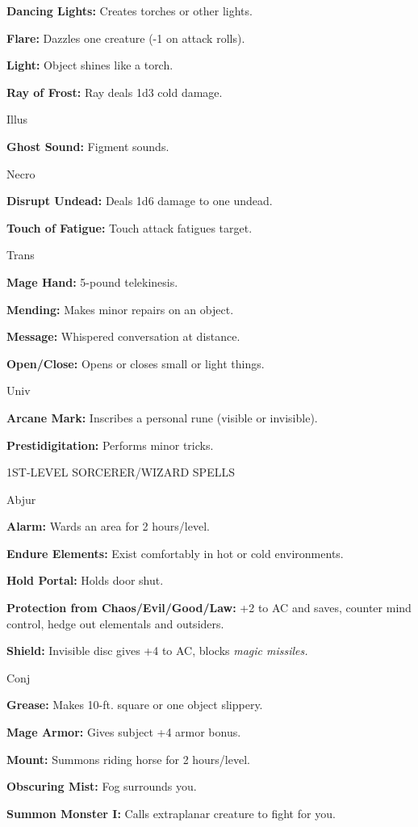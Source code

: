 \documentclass{article}
\begin{document}
\textbf{Dancing Lights:} Creates torches or other lights.

\textbf{Flare:} Dazzles one creature (-1 on attack rolls).

\textbf{Light:} Object shines like a torch.

\textbf{Ray of Frost:} Ray deals 1d3 cold damage.

Illus

\textbf{Ghost Sound:} Figment sounds.

Necro

\textbf{Disrupt Undead:} Deals 1d6 damage to one undead.

\textbf{Touch of Fatigue:} Touch attack fatigues target.

Trans

\textbf{Mage Hand:} 5-pound telekinesis.

\textbf{Mending:} Makes minor repairs on an object.

\textbf{Message:} Whispered conversation at distance.

\textbf{Open/Close:} Opens or closes small or light things.

Univ

\textbf{Arcane Mark:} Inscribes a personal rune (visible or invisible).

\textbf{Prestidigitation:} Performs minor tricks.

1ST-LEVEL SORCERER/WIZARD SPELLS

Abjur

\textbf{Alarm:} Wards an area for 2 hours/level.

\textbf{Endure Elements:} Exist comfortably in hot or cold environments.

\textbf{Hold Portal:} Holds door shut.

\textbf{Protection from Chaos/Evil/Good/Law:} +2 to AC and saves, counter mind 
control, hedge out elementals and outsiders.

\textbf{Shield:} Invisible disc gives +4 to AC, blocks \textit{magic missiles.}

Conj

\textbf{Grease:} Makes 10-ft. square or one object slippery.

\textbf{Mage Armor:} Gives subject +4 armor bonus.

\textbf{Mount:} Summons riding horse for 2 hours/level.

\textbf{Obscuring Mist:} Fog surrounds you.

\textbf{Summon Monster I:} Calls extraplanar creature to fight for you.
\end{document}
